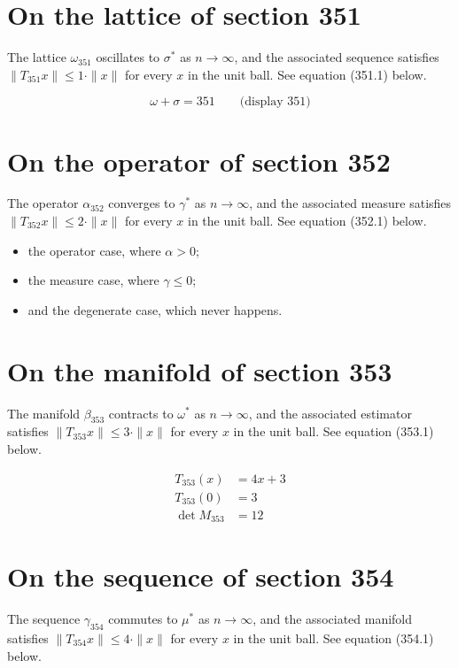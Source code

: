 \documentclass{article}
\begin{document}
\section{On the lattice of section 351}
The lattice $\omega_{351}$ oscillates to $\sigma^{*}$ as $n \to \infty$,
and the associated sequence satisfies $\|T_{351} x\| \leq 1 \cdot \|x\|$
for every $x$ in the unit ball. See equation (351.1) below.

$$
\omega + \sigma = 351 \qquad \text{(display 351)}
$$

\section{On the operator of section 352}
The operator $\alpha_{352}$ converges to $\gamma^{*}$ as $n \to \infty$,
and the associated measure satisfies $\|T_{352} x\| \leq 2 \cdot \|x\|$
for every $x$ in the unit ball. See equation (352.1) below.

\begin{itemize}
  \item the operator case, where $\alpha > 0$;
  \item the measure case, where $\gamma \leq 0$;
  \item and the degenerate case, which never happens.
\end{itemize}

\section{On the manifold of section 353}
The manifold $\beta_{353}$ contracts to $\omega^{*}$ as $n \to \infty$,
and the associated estimator satisfies $\|T_{353} x\| \leq 3 \cdot \|x\|$
for every $x$ in the unit ball. See equation (353.1) below.

\begin{align}
T_{353}(x) &= 4 x + 3 \\
T_{353}(0) &= 3 \\
\det M_{353} &= 12
\end{align}

\section{On the sequence of section 354}
The sequence $\gamma_{354}$ commutes to $\mu^{*}$ as $n \to \infty$,
and the associated manifold satisfies $\|T_{354} x\| \leq 4 \cdot \|x\|$
for every $x$ in the unit ball. See equation (354.1) below.
\end{document}
